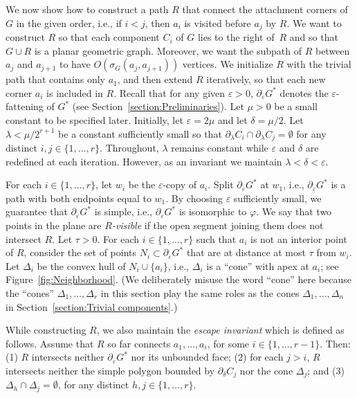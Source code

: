 \documentclass[11pt]{patmorin}
\begin{document}
We now show how to construct a path $R$ that connect the attachment corners of $G$ in the given order, i.e., if $i < j$, then $a_i$ is visited before $a_j$ by $R$. We want to construct $R$ so that each component $C_i$ of $G$ lies to the right of~$R$ and so that $G\cup R$ is a planar geometric graph.
Moreover, we want the subpath of $R$ between $a_j$ and $a_{j+1}$ to have $O(\sigma_G(a_j, a_{j+1}))$ vertices. 
We initialize $R$ with the trivial path that contains only $a_1$, and then extend $R$ iteratively, so that each new corner $a_i$ is included in $R$.
Recall that  for any given $\varepsilon >0$, $\partial_\varepsilon G^*$ denotes the $\varepsilon$-fattening of $G^*$ (see Section~\ref{section:Preliminaries}).
Let $\mu>0$ be a small constant to be specified later.
Initially, let $\varepsilon = 2\mu$ and let $\delta = \mu/2$. Let $\lambda < \mu/2^{r+1}$ be a constant sufficiently small so that $\partial_\lambda C_i \cap \partial_\lambda C_j = \emptyset$ for any distinct $i,j\in\{1,\ldots,r\}$.
Throughout, $\lambda$ remains constant while $\varepsilon$ and $\delta$ are redefined at each iteration. However, as an invariant we maintain $\lambda < \delta < \varepsilon$.

For each $i\in \{1,\dots,r\}$, let $w_i$ be the $\varepsilon$-copy of  $a_i$.
Split $\partial_\varepsilon G^*$ at $w_1$, i.e., $\partial_\varepsilon G^*$ is a path with both endpoints equal to $w_1$.
By choosing $\varepsilon$ sufficiently small, we guarantee that $\partial_\varepsilon G^*$ is simple, i.e., $\partial_\varepsilon G^*$ is isomorphic to $\varphi$.
We say that two points in the plane are \emph{$R$-visible} if the open segment joining them does not intersect $R$.
Let $\tau >0$. For each $i\in \{1,\dots,r\}$ such that $a_i$ is not an interior point of $R$, consider the set of points $N_i\subset \partial_\varepsilon G^*$ that are at distance at most $\tau$ from $w_i$.
Let $\Delta_i$ be the convex hull of $N_i\cup \{a_i\}$, i.e., $\Delta_i$ is a ``cone'' with apex at $a_i$; see Figure~\ref{fig:Neighborhood}. (We deliberately misuse the word ``cone'' here because the ``cones'' $\Delta_1,\ldots,\Delta_r$ in this section play the same roles as the cones $\Delta_1,\ldots,\Delta_n$ in Section~\ref{section:Trivial components}.)


While constructing $R$, we also maintain the \emph{escape invariant} which is defined as follows. Assume that $R$ so far connects $a_1,\ldots,a_i$, for some $i\in \{1,\dots,r-1\}$. Then: (1) $R$ intersects neither $\partial_\varepsilon G^*$ nor its unbounded face; (2) for each $j>i$, $R$ intersects neither the simple polygon bounded by $\partial_\delta C_j$ nor the cone $\Delta_j$; and (3) $\Delta_h\cap \Delta_j = \emptyset$, for any distinct $h,j\in\{1,\ldots,r\}$. 
\end{document}
